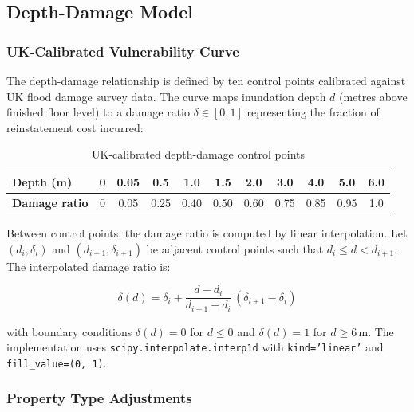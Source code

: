 \documentclass[11pt,a4paper]{article}
\begin{document}
\subsection{Depth-Damage Model}
\label{sec:depth_damage}

\subsubsection{UK-Calibrated Vulnerability Curve}

The depth-damage relationship is defined by ten control points calibrated against UK
flood damage survey data. The curve maps inundation depth $d$ (metres above finished
floor level) to a damage ratio $\delta \in [0,1]$ representing the fraction of
reinstatement cost incurred:

\begin{table}[H]
\centering
\begin{tabular}{lcccccccccc}
    \toprule
    \textbf{Depth (m)} & 0 & 0.05 & 0.5 & 1.0 & 1.5 & 2.0 & 3.0 & 4.0 & 5.0 & 6.0 \\
    \midrule
    \textbf{Damage ratio} & 0 & 0.05 & 0.25 & 0.40 & 0.50 & 0.60 & 0.75 & 0.85 & 0.95 & 1.0 \\
    \bottomrule
\end{tabular}
\caption{UK-calibrated depth-damage control points}
\label{tab:dd_control}
\end{table}

Between control points, the damage ratio is computed by linear interpolation. Let
$(d_i, \delta_i)$ and $(d_{i+1}, \delta_{i+1})$ be adjacent control points such that
$d_i \leq d < d_{i+1}$. The interpolated damage ratio is:

\begin{equation}
    \delta(d) = \delta_i + \frac{d - d_i}{d_{i+1} - d_i} \, (\delta_{i+1} - \delta_i)
    \label{eq:dd_interp}
\end{equation}

\noindent with boundary conditions $\delta(d) = 0$ for $d \leq 0$ and $\delta(d) = 1$
for $d \geq 6\,$m. The implementation uses \texttt{scipy.interpolate.interp1d} with
\texttt{kind='linear'} and \texttt{fill\_value=(0, 1)}.

\subsubsection{Property Type Adjustments}
\end{document}

